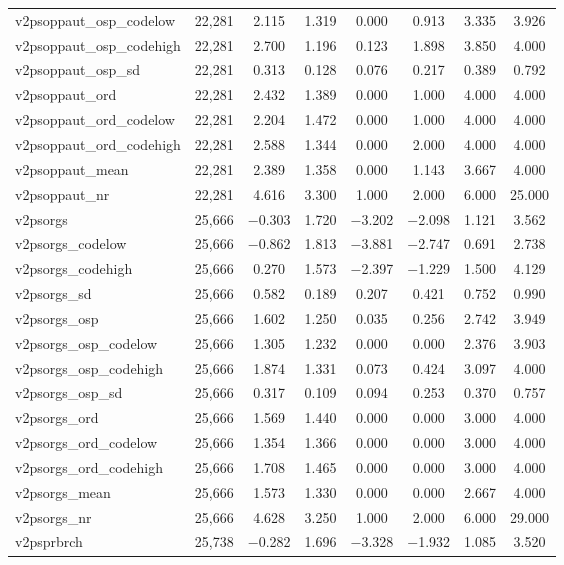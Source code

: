 \begin{table}[!htbp]
\begin{tabular}{@{\extracolsep{5pt}}lccccccc}
v2psoppaut\_osp\_codelow & 22,281 & 2.115 & 1.319 & 0.000 & 0.913 & 3.335 & 3.926 \\ 
v2psoppaut\_osp\_codehigh & 22,281 & 2.700 & 1.196 & 0.123 & 1.898 & 3.850 & 4.000 \\ 
v2psoppaut\_osp\_sd & 22,281 & 0.313 & 0.128 & 0.076 & 0.217 & 0.389 & 0.792 \\ 
v2psoppaut\_ord & 22,281 & 2.432 & 1.389 & 0.000 & 1.000 & 4.000 & 4.000 \\ 
v2psoppaut\_ord\_codelow & 22,281 & 2.204 & 1.472 & 0.000 & 1.000 & 4.000 & 4.000 \\ 
v2psoppaut\_ord\_codehigh & 22,281 & 2.588 & 1.344 & 0.000 & 2.000 & 4.000 & 4.000 \\ 
v2psoppaut\_mean & 22,281 & 2.389 & 1.358 & 0.000 & 1.143 & 3.667 & 4.000 \\ 
v2psoppaut\_nr & 22,281 & 4.616 & 3.300 & 1.000 & 2.000 & 6.000 & 25.000 \\ 
v2psorgs & 25,666 & $-$0.303 & 1.720 & $-$3.202 & $-$2.098 & 1.121 & 3.562 \\ 
v2psorgs\_codelow & 25,666 & $-$0.862 & 1.813 & $-$3.881 & $-$2.747 & 0.691 & 2.738 \\ 
v2psorgs\_codehigh & 25,666 & 0.270 & 1.573 & $-$2.397 & $-$1.229 & 1.500 & 4.129 \\ 
v2psorgs\_sd & 25,666 & 0.582 & 0.189 & 0.207 & 0.421 & 0.752 & 0.990 \\ 
v2psorgs\_osp & 25,666 & 1.602 & 1.250 & 0.035 & 0.256 & 2.742 & 3.949 \\ 
v2psorgs\_osp\_codelow & 25,666 & 1.305 & 1.232 & 0.000 & 0.000 & 2.376 & 3.903 \\ 
v2psorgs\_osp\_codehigh & 25,666 & 1.874 & 1.331 & 0.073 & 0.424 & 3.097 & 4.000 \\ 
v2psorgs\_osp\_sd & 25,666 & 0.317 & 0.109 & 0.094 & 0.253 & 0.370 & 0.757 \\ 
v2psorgs\_ord & 25,666 & 1.569 & 1.440 & 0.000 & 0.000 & 3.000 & 4.000 \\ 
v2psorgs\_ord\_codelow & 25,666 & 1.354 & 1.366 & 0.000 & 0.000 & 3.000 & 4.000 \\ 
v2psorgs\_ord\_codehigh & 25,666 & 1.708 & 1.465 & 0.000 & 0.000 & 3.000 & 4.000 \\ 
v2psorgs\_mean & 25,666 & 1.573 & 1.330 & 0.000 & 0.000 & 2.667 & 4.000 \\ 
v2psorgs\_nr & 25,666 & 4.628 & 3.250 & 1.000 & 2.000 & 6.000 & 29.000 \\ 
v2psprbrch & 25,738 & $-$0.282 & 1.696 & $-$3.328 & $-$1.932 & 1.085 & 3.520 \\ 

\end{tabular}
\end{table}
